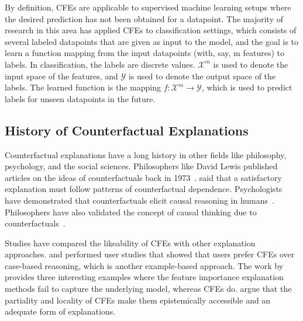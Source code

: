 By definition, CFEs are applicable to supervised machine learning setups where the desired prediction has not been obtained for a datapoint. 
The majority of research in this area has applied CFEs to classification settings, which consists of several labeled datapoints that are given as input to the model, and the goal is to learn a function mapping from the input datapoints (with, say, m features) to labels. 
In classification, the labels are discrete values. 
$\mathcal{X}^m$ is used to denote the input space of the features, and $\mathcal{Y}$ is used to denote the output space of the labels. 
The learned function is the mapping $f: \mathcal{X}^m \to \mathcal{Y}$, which is used to predict labels for unseen datapoints in the future. 


\vspace{-2pt}
\subsection{History of Counterfactual Explanations}

Counterfactual explanations have a long history in other fields like philosophy, psychology, and the social sciences. Philosophers like David Lewis published articles on the ideas of counterfactuals back in 1973~\citep{Lewis1973:phil2}. 
\citet{Woodward2003:phil4} said that a satisfactory explanation must follow patterns of counterfactual dependence. 
Psychologists have demonstrated that counterfactuals elicit causal reasoning in humans~\citep{Byrne:psycho1,Byrne2019:psycho2,Kahneman1986:psycho3}. 
Philosophers have also validated the concept of causal thinking due to counterfactuals~\citep{VanFraassenBas1980:phil5,Woodward2003:phil4}. 


Studies have compared the likeability of CFEs with other explanation approaches. 
\citet{Binns:2018} and \citet{Dodge-explaining:2019} performed user studies that showed that users prefer CFEs over case-based reasoning, which is another example-based approach. 
The work by \citet{fernandez-loria_explaining_2020} provides three interesting examples where the feature importance explanation methods fail to capture the underlying model, whereas CFEs do. 
\citet{cfe-fair-adequate-Asher} argue that the partiality and locality of CFEs make them epistemically accessible and an adequate form of explanations. 

